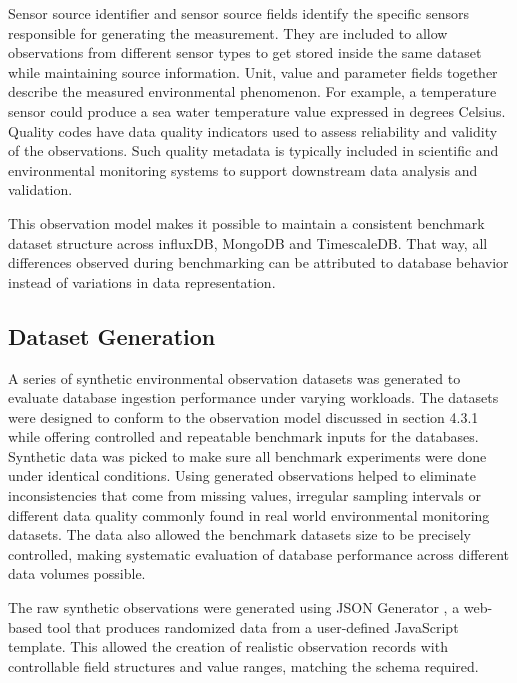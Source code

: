 Sensor source identifier and sensor source fields identify the specific sensors responsible for generating the measurement. They are included to allow observations from different sensor types to get stored inside the same dataset while maintaining source information. Unit, value and parameter fields together describe the measured environmental phenomenon. For example, a temperature sensor could produce a sea water temperature value expressed in degrees Celsius. Quality codes have data quality indicators used to assess reliability and validity of the observations. Such quality metadata is typically included in scientific and environmental monitoring systems to support downstream data analysis and validation. 


This observation model makes it possible to maintain a consistent benchmark dataset structure across influxDB, MongoDB and TimescaleDB. That way, all differences observed during benchmarking can be attributed to database behavior instead of variations in data representation. 

\subsection{Dataset Generation}
A series of synthetic environmental observation datasets was generated to evaluate database ingestion performance under varying workloads. The datasets were designed to conform to the observation model discussed in section 4.3.1 while offering controlled and repeatable benchmark inputs for the databases. Synthetic data was picked to make sure all benchmark experiments were done under identical conditions. Using generated observations helped to eliminate inconsistencies that come from missing values, irregular sampling intervals or different data quality commonly found in real world environmental monitoring datasets. The data also allowed the benchmark datasets size to be precisely controlled, making systematic evaluation of database performance across different data volumes possible. 


The raw synthetic observations were generated using JSON Generator \citep{jsongenerator}, a web-based tool that produces randomized data from a user-defined JavaScript template. This allowed the creation of realistic observation records with controllable field structures and value ranges, matching the schema required.


